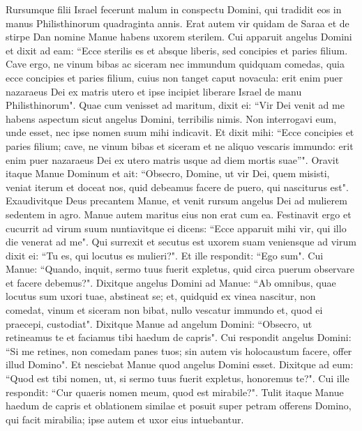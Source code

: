 \begin{biblechapter}  
\verse Rursumque filii Israel fecerunt malum in conspectu Domini, qui tradidit eos in manus Philisthinorum quadraginta annis. 
\verse Erat autem vir quidam de Saraa et de stirpe Dan nomine Manue habens uxorem sterilem. 
\verse Cui apparuit angelus Domini et dixit ad eam: “Ecce sterilis es et absque liberis, sed concipies et paries filium. 
\verse Cave ergo, ne vinum bibas ac siceram nec immundum quidquam comedas, 
\verse quia ecce concipies et paries filium, cuius non tanget caput novacula: erit enim puer nazaraeus Dei ex matris utero et ipse incipiet liberare Israel de manu Philisthinorum". 
\verse Quae cum venisset ad maritum, dixit ei: “Vir Dei venit ad me habens aspectum sicut angelus Domini, terribilis nimis. Non interrogavi eum, unde esset, nec ipse nomen suum mihi indicavit. 
\verse Et dixit mihi: “Ecce concipies et paries filium; cave, ne vinum bibas et siceram et ne aliquo vescaris immundo: erit enim puer nazaraeus Dei ex utero matris usque ad diem mortis suae”". 
\verse Oravit itaque Manue Dominum et ait: “Obsecro, Domine, ut vir Dei, quem misisti, veniat iterum et doceat nos, quid debeamus facere de puero, qui nasciturus est". 
\verse Exaudivitque Deus precantem Manue, et venit rursum angelus Dei ad mulierem sedentem in agro. Manue autem maritus eius non erat cum ea. 
\verse Festinavit ergo et cucurrit ad virum suum nuntiavitque ei dicens: “Ecce apparuit mihi vir, qui illo die venerat ad me". 
\verse Qui surrexit et secutus est uxorem suam veniensque ad virum dixit ei: “Tu es, qui locutus es mulieri?". Et ille respondit: “Ego sum". 
\verse Cui Manue: “Quando, inquit, sermo tuus fuerit expletus, quid circa puerum observare et facere debemus?".  
\verse Dixitque angelus Domini ad Manue: “Ab omnibus, quae locutus sum uxori tuae, abstineat se; 
\verse et, quidquid ex vinea nascitur, non comedat, vinum et siceram non bibat, nullo vescatur immundo et, quod ei praecepi, custodiat". 
\verse Dixitque Manue ad angelum Domini: “Obsecro, ut retineamus te et faciamus tibi haedum de capris". 
\verse Cui respondit angelus Domini: “Si me retines, non comedam panes tuos; sin autem vis holocaustum facere, offer illud Domino". Et nesciebat Manue quod angelus Domini esset. 
\verse Dixitque ad eum: “Quod est tibi nomen, ut, si sermo tuus fuerit expletus, honoremus te?". 
\verse Cui ille respondit: “Cur quaeris nomen meum, quod est mirabile?". 
\verse Tulit itaque Manue haedum de capris et oblationem similae et posuit super petram offerens Domino, qui facit mirabilia; ipse autem et uxor eius intuebantur. 

\end{biblechapter}
